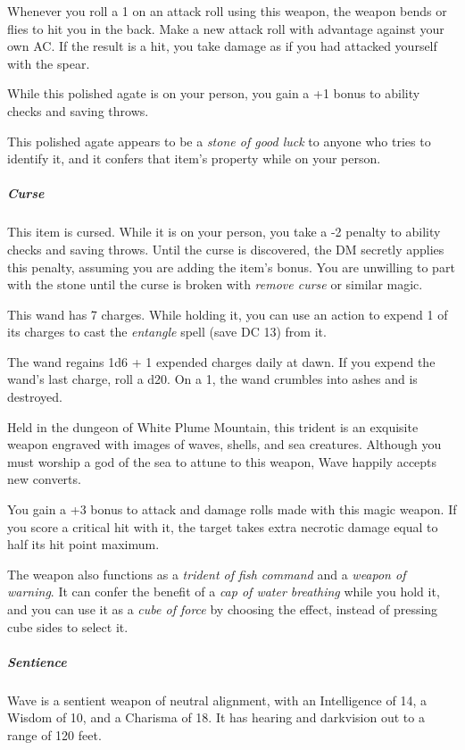 \documentclass[10pt,a4paper,twoside,bg=print,twocolumn,openany,nodeprecatedcode]{dndbook}
\begin{document}
Whenever you roll a 1 on an attack roll using this weapon, the weapon bends or flies to hit you in the back. Make a new attack roll with advantage against your own AC. If the result is a hit, you take damage as if you had attacked yourself with the spear.

While this polished agate is on your person, you gain a +1 bonus to ability checks and saving throws.

This polished agate appears to be a \textit{stone of good luck} to anyone who tries to identify it, and it confers that item's property while on your person.

\subparagraph{Curse}
This item is cursed. While it is on your person, you take a -2 penalty to ability checks and saving throws. Until the curse is discovered, the DM secretly applies this penalty, assuming you are adding the item's bonus. You are unwilling to part with the stone until the curse is broken with \textit{remove curse} or similar magic.

This wand has 7 charges. While holding it, you can use an action to expend 1 of its charges to cast the \textit{entangle} spell (save DC 13) from it.

The wand regains 1d6 + 1 expended charges daily at dawn. If you expend the wand's last charge, roll a d20. On a 1, the wand crumbles into ashes and is destroyed.

Held in the dungeon of White Plume Mountain, this trident is an exquisite weapon engraved with images of waves, shells, and sea creatures. Although you must worship a god of the sea to attune to this weapon, Wave happily accepts new converts.

You gain a +3 bonus to attack and damage rolls made with this magic weapon. If you score a critical hit with it, the target takes extra necrotic damage equal to half its hit point maximum.

The weapon also functions as a \textit{trident of fish command} and a \textit{weapon of warning}. It can confer the benefit of a \textit{cap of water breathing} while you hold it, and you can use it as a \textit{cube of force} by choosing the effect, instead of pressing cube sides to select it.

\subparagraph{Sentience}
Wave is a sentient weapon of neutral alignment, with an Intelligence of 14, a Wisdom of 10, and a Charisma of 18. It has hearing and darkvision out to a range of 120 feet.
\end{document}

